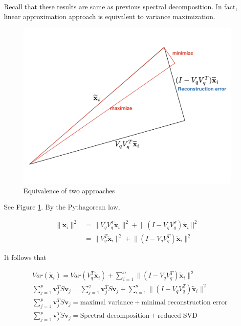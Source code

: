 \documentclass[]{book}
\theoremstyle{definition}
\theoremstyle{definition}
\theoremstyle{definition}
\theoremstyle{remark}
\begin{document}
Recall that these results are same as previous spectral decomposition. In fact, linear approximation approach is equivalent to variance maximization.

\begin{figure}[H]

{\centering \includegraphics[width=0.7\linewidth]{images/pcaequiv} 

}

\caption{Equivalence of two approaches}\label{fig:pcaequiv}
\end{figure}

See Figure \ref{fig:pcaequiv}. By the Pythagorean law,

\begin{equation*}
  \begin{split}
    \lVert \widetilde{\mathbf{x}}_i \rVert^2 & = \lVert V_q V_q^T \widetilde{\mathbf{x}}_i \rVert^2 + \lVert ( I - V_q V_q^T ) \widetilde{\mathbf{x}}_i \rVert^2 \\
     & = \lVert V_q^T  \widetilde{\mathbf{x}}_i \rVert^2 + \lVert ( I - V_q V_q^T ) \widetilde{\mathbf{x}}_i \rVert^2
  \end{split}
\end{equation*}

It follows that

\begin{equation*}
  \begin{split}
    & Var(\widetilde{\mathbf{x}}_i) = Var(V_q^T \widetilde{\mathbf{x}}_i) + \sum_{i = 1}^n \lVert ( I - V_q V_q^T ) \widetilde{\mathbf{x}}_i \rVert^2 \\
    & \sum_{j = 1}^p \mathbf{v}_j^T S \mathbf{v}_j = \sum_{j = 1}^q \mathbf{v}_j^T S \mathbf{v}_j + \sum_{i = 1}^n \lVert ( I - V_q V_q^T ) \widetilde{\mathbf{x}}_i \rVert^2 \\
    & \sum_{j = 1}^p \mathbf{v}_j^T S \mathbf{v}_j = \text{maximal variance} + \text{minimal reconstruction error} \\
    & \sum_{j = 1}^p \mathbf{v}_j^T S \mathbf{v}_j = \text{Spectral decomposition} + \text{reduced SVD}
  \end{split}
\end{equation*}
\end{document}
